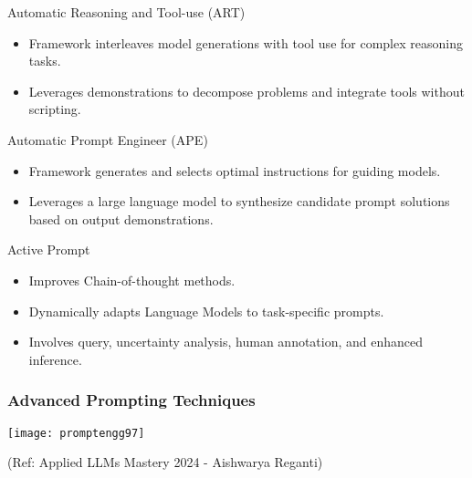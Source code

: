 \begin{frame}[fragile]{Automatic Reasoning and Tool-use (ART)}
    \begin{itemize}
        \item Framework interleaves model generations with tool use for complex reasoning tasks.
        \item Leverages demonstrations to decompose problems and integrate tools without scripting.
    \end{itemize}
\end{frame}

\begin{frame}[fragile]{Automatic Prompt Engineer (APE)}
    \begin{itemize}
        \item Framework generates and selects optimal instructions for guiding models.
        \item Leverages a large language model to synthesize candidate prompt solutions based on output demonstrations.
    \end{itemize}
\end{frame}

\begin{frame}[fragile]{Active Prompt}
    \begin{itemize}
        \item Improves Chain-of-thought methods.
        \item Dynamically adapts Language Models to task-specific prompts.
        \item Involves query, uncertainty analysis, human annotation, and enhanced inference.
    \end{itemize}
\end{frame}

\begin{frame}[fragile]\frametitle{Advanced Prompting Techniques}

\begin{center}
\texttt{[image: promptengg97]}
\end{center}				

{\tiny (Ref: Applied LLMs Mastery 2024 - Aishwarya Reganti)}

\end{frame}


